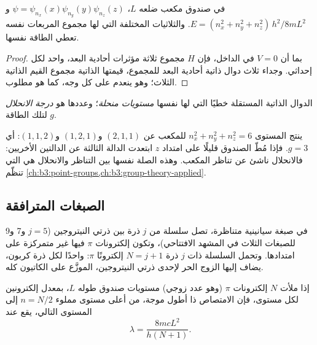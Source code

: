 \begin{proposition}\label{prop:b3:quantum-model-systems:box-3d}
في صندوق مكعب ضلعه $L$، $\psi = \psi_{n_x}(x)\psi_{n_y}(y)\psi_{n_z}(z)$ 
و$E = (n_x^2 + n_y^2 + n_z^2)\,h^2/8mL^2$. والثلاثيات المختلفة التي لها مجموع
المربعات نفسه تعطي الطاقة نفسها.
\end{proposition}

\begin{proof}
بما أن $V = 0$ في الداخل، فإن $\hat H$ مجموع ثلاثة مؤثرات أحادية البعد،
واحد لكل إحداثي. وجداء ثلاث دوال ذاتية أحادية البعد
 للمجموع، قيمتها الذاتية مجموع القيم الذاتية الثلاث؛ وهو
ينعدم على كل وجه، كما هو مطلوب.
\end{proof}

\begin{definition}\label{def:b3:quantum-model-systems:degenerate}
الدوال الذاتية المستقلة خطيًا التي لها  نفسها
\emph{مستويات منحلة}؛ وعددها هو
\emph{درجة الانحلال} $g$ لتلك الطاقة.
\end{definition}

\begin{example}\label{ex:b3:quantum-model-systems:cube}
ينتج المستوى $n_x^2 + n_y^2 + n_z^2 = 6$ للمكعب عن $(2,1,1)$
و$(1,2,1)$ و$(1,1,2)$: أي $g = 3$. فإذا مُطّ الصندوق قليلًا على امتداد $z$
ابتعدت الدالة الثالثة عن الدالتين الأخريين: فالانحلال ناشئ عن
تناظر المكعب. وهذه الصلة نفسها بين التناظر والانحلال
هي التي تنظّم \cref{ch:b3:point-groups,ch:b3:group-theory-applied}.
\end{example}

\subsection*{الصبغات المترافقة}

في صبغة سيانينية متناظرة، تصل سلسلة من $j$ ذرة بين ذرتي النيتروجين
(\(j = 5\) و7 و9 للصبغات الثلاث في المشهد الافتتاحي)، وتكون إلكترونات $\pi$
فيها غير متمركزة على امتدادها. وتحمل السلسلة ذات $j$ ذرة $N = j + 1$ إلكترونًا
$\pi$: واحدًا لكل ذرة كربون، يضاف إليها الزوج الحر لإحدى ذرتي النيتروجين، الموزَّع
على الكاتيون كله.

\begin{proposition}\label{prop:b3:quantum-model-systems:free-electron}
إذا ملأت $N$ إلكترونات $\pi$ (وهو عدد زوجي) مستويات صندوق طوله $L$،
بمعدل إلكترونين لكل مستوى، فإن الامتصاص ذا أطول موجة، من أعلى مستوى
مملوء $n = N/2$ إلى المستوى التالي، يقع عند
\[
\lambda = \frac{8mcL^2}{h(N+1)}.
\]
\end{proposition}

